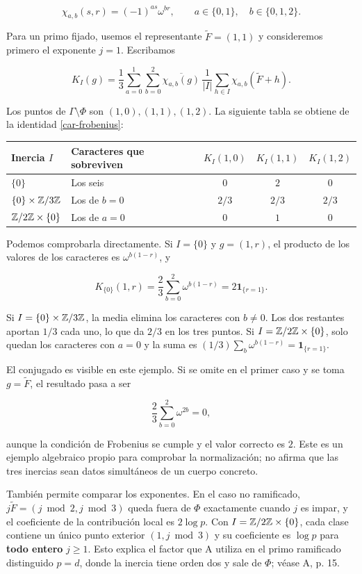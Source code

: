 \[
\chi_{a,b}(s,r)=(-1)^{as}\omega^{br},
\qquad a\in\{0,1\},\quad b\in\{0,1,2\}.
\]

Para un primo fijado, usemos el representante $\widetilde F=(1,1)$ y consideremos primero el exponente $j=1$. Escribamos

\begin{equation}
K_I(g)=\frac13\sum_{a=0}^1\sum_{b=0}^2
\overline{\chi_{a,b}(g)}\,
\frac1{|I|}\sum_{h\in I}\chi_{a,b}(\widetilde F+h).
\label{car-nucleo-ejemplo}
\end{equation}

Los puntos de $\Gamma\setminus\Phi$ son $(1,0),(1,1),(1,2)$. La siguiente tabla se obtiene de la identidad \eqref{car-frobenius}:

\begin{center}
\small
\begin{tabularx}{\textwidth}{@{}lYccc@{}}
\toprule
Inercia $I$ & Caracteres que sobreviven & $K_I(1,0)$ & $K_I(1,1)$ & $K_I(1,2)$ \\
\midrule
$\{0\}$ & Los seis & $0$ & $2$ & $0$ \\
$\{0\}\times\mathbb{Z}/3\mathbb{Z}$ & Los de $b=0$ & $2/3$ & $2/3$ & $2/3$ \\
$\mathbb{Z}/2\mathbb{Z}\times\{0\}$ & Los de $a=0$ & $0$ & $1$ & $0$ \\
\bottomrule
\end{tabularx}
\end{center}

Podemos comprobarla directamente. Si $I=\{0\}$ y $g=(1,r)$, el producto de los valores de los caracteres es $\omega^{b(1-r)}$, y

\[
K_{\{0\}}(1,r)
=\frac23\sum_{b=0}^2\omega^{b(1-r)}
=2\mathbf1_{\{r=1\}}.
\]

Si $I=\{0\}\times\mathbb{Z}/3\mathbb{Z}$, la media elimina los caracteres con $b\ne0$. Los dos restantes aportan $1/3$ cada uno, lo que da $2/3$ en los tres puntos. Si $I=\mathbb{Z}/2\mathbb{Z}\times\{0\}$, solo quedan los caracteres con $a=0$ y la suma es $(1/3)\sum_b\omega^{b(1-r)}=\mathbf1_{\{r=1\}}$.

El conjugado es visible en este ejemplo. Si se omite en el primer caso y se toma $g=\widetilde F$, el resultado pasa a ser

\[
\frac23\sum_{b=0}^2\omega^{2b}=0,
\]

aunque la condición de Frobenius se cumple y el valor correcto es $2$. Este es un ejemplo algebraico propio para comprobar la normalización; no afirma que las tres inercias sean datos simultáneos de un cuerpo concreto.

También permite comparar los exponentes. En el caso no ramificado, $j\widetilde F=(j\bmod2,j\bmod3)$ queda fuera de $\Phi$ exactamente cuando $j$ es impar, y el coeficiente de la contribución local es $2\log p$. Con $I=\mathbb{Z}/2\mathbb{Z}\times\{0\}$, cada clase contiene un único punto exterior $(1,j\bmod3)$ y su coeficiente es $\log p$ para \textbf{todo entero} $j\ge1$. Esto explica el factor que A utiliza en el primo ramificado distinguido $p=d$, donde la inercia tiene orden dos y sale de $\Phi$; véase A, p. 15.

